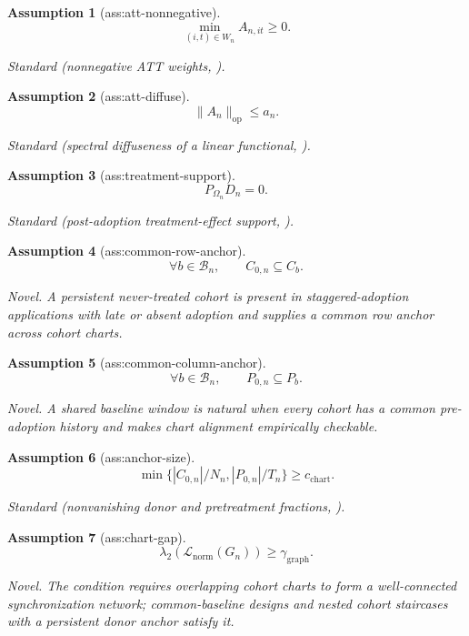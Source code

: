 \documentclass{article}
\newtheorem{assumption}{Assumption}
\begin{document}
\begin{assumption}[ass:att-nonnegative]\label{ass:att-nonnegative}
\[\min_{(i,t)\in W_n}A_{n,it}\ge0.\]
\par\smallskip\noindent\emph{Standard} (nonnegative ATT weights, \cite{FariasLiPeng2021}).
\end{assumption}

\begin{assumption}[ass:att-diffuse]\label{ass:att-diffuse}
\[\lVert A_n\rVert_{\mathrm{op}}\le a_n.\]
\par\smallskip\noindent\emph{Standard} (spectral diffuseness of a linear functional, \cite{FariasLiPeng2021}).
\end{assumption}

\begin{assumption}[ass:treatment-support]\label{ass:treatment-support}
\[P_{\Omega_n}D_n=0.\]
\par\smallskip\noindent\emph{Standard} (post-adoption treatment-effect support, \cite{ArkhangelskyImbens2024}).
\end{assumption}

\begin{assumption}[ass:common-row-anchor]\label{ass:common-row-anchor}
\[\forall b\in\mathcal B_n,\qquad C_{0,n}\subseteq C_b.\]
\par\smallskip\noindent\emph{Novel.} A persistent never-treated cohort is present in staggered-adoption applications with late or absent adoption and supplies a common row anchor across cohort charts.
\end{assumption}

\begin{assumption}[ass:common-column-anchor]\label{ass:common-column-anchor}
\[\forall b\in\mathcal B_n,\qquad P_{0,n}\subseteq P_b.\]
\par\smallskip\noindent\emph{Novel.} A shared baseline window is natural when every cohort has a common pre-adoption history and makes chart alignment empirically checkable.
\end{assumption}

\begin{assumption}[ass:anchor-size]\label{ass:anchor-size}
\[\min\{|C_{0,n}|/N_n,|P_{0,n}|/T_n\}\ge c_{\mathrm{chart}}.\]
\par\smallskip\noindent\emph{Standard} (nonvanishing donor and pretreatment fractions, \cite{BaiNg2021}).
\end{assumption}

\begin{assumption}[ass:chart-gap]\label{ass:chart-gap}
\[\lambda_2(\mathcal L_{\mathrm{norm}}(G_n))\ge\gamma_{\mathrm{graph}}.\]
\par\smallskip\noindent\emph{Novel.} The condition requires overlapping cohort charts to form a well-connected synchronization network; common-baseline designs and nested cohort staircases with a persistent donor anchor satisfy it.
\end{assumption}
\end{document}
